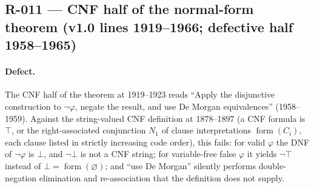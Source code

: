 
\subsection*{R-011 --- CNF half of the normal-form theorem (v1.0 lines 1919--1966; defective half 1958--1965)}

\paragraph{Defect.} The CNF half of the theorem at 1919--1923 reads ``Apply
the disjunctive construction to \(\neg\varphi\), negate the result, and use
De Morgan equivalences'' (1958--1959).  Against the string-valued CNF
definition at 1878--1897 (a CNF formula is \(\top\), or the right-associated
conjunction \(N_1\) of clause interpretations \(\operatorname{form}(C_i)\),
each clause listed in strictly increasing code order), this fails: for valid
\(\varphi\) the DNF of \(\neg\varphi\) is \(\bot\), and \(\neg\bot\) is not a
CNF string; for variable-free false \(\varphi\) it yields \(\neg\top\)
instead of \(\bot=\operatorname{form}(\varnothing)\); and ``use De Morgan''
silently performs double-negation elimination and re-association that the
definition does not supply.

